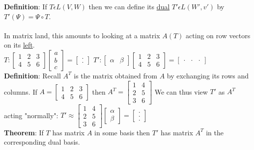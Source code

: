 \documentclass{article}
\begin{document}
\textbf{Definition}: If $T\epsilon L(V,W)$ then we can define its \underline{dual} $T' \epsilon L(W', v')$ by $T'(\Psi) = \Psi \circ T$. \\\\
In matrix land, this amounts to looking at a matrix $A(T)$ acting on row vectors on its \underline{left}. \\
$T: \begin{bmatrix}
    1&2&3\\4&5&6
\end{bmatrix} \begin{bmatrix}
    a\\b\\c
\end{bmatrix} = \begin{bmatrix}
    . \\ .
\end{bmatrix}$
$T' : \begin{bmatrix}
    \alpha & \beta 
\end{bmatrix} \begin{bmatrix}
    1&2&3\\4&5&6
\end{bmatrix} = \begin{bmatrix}
    . &. &.
\end{bmatrix}$ \\
\textbf{Definition}: Recall $A^T$ is the matrix obtained from $A$ by exchanging its rows and columns. If $A = \begin{bmatrix}
    1&2&3\\4&5&6
\end{bmatrix}$ then $A^T = \begin{bmatrix}
    1&4\\2&5\\3&6
\end{bmatrix}$ We can thus view $T'$ as $A^T$ acting "normally": $T' \approx \begin{bmatrix}
    1&4\\2&5\\3&6
\end{bmatrix} \begin{bmatrix}
    \alpha \\ \beta 
\end{bmatrix} = \begin{bmatrix}
    .\\.\\.
\end{bmatrix}$\\
\textbf{Theorem}: If $T$ has matrix $A$ in some basis then $T'$ has matrix $A^T$ in the corresponding dual basis. \\\\
\end{document}
